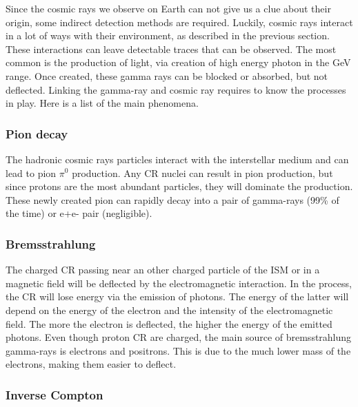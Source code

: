Since the cosmic rays we observe on Earth can not give us a clue about their origin, some indirect detection methods are required. Luckily, cosmic rays interact in a lot of ways with their environment, as described in the previous section. These interactions can leave detectable traces that can be observed. The most common is the production of light, via creation of high energy photon in the GeV range. Once created, these gamma rays can be blocked or absorbed, but not deflected. Linking the gamma-ray and cosmic ray requires to know the processes in play. Here is a list of the main phenomena.

\subsubsection{Pion decay}


The hadronic cosmic rays  particles interact with the interstellar medium and can lead to pion $\pi^0$ production. Any CR nuclei can result in pion production, but since protons are the most abundant particles, they will dominate the production. 
These newly created pion can rapidly decay into a pair of gamma-rays (99\% of the time) or e+e- pair (negligible).




\subsubsection{Bremsstrahlung}


The charged CR passing near an other charged particle of the ISM or in a magnetic field will be deflected by the electromagnetic interaction. In the process, the CR will lose energy via the emission of photons. The energy of the latter will depend on the energy of the electron and the intensity of the electromagnetic field. The more the electron is deflected, the higher the energy of the emitted photons.
Even though proton CR are charged, the main source of bremsstrahlung gamma-rays is electrons and positrons. This is due to the much lower mass of the electrons, making them easier to deflect.



\subsubsection{Inverse Compton}


